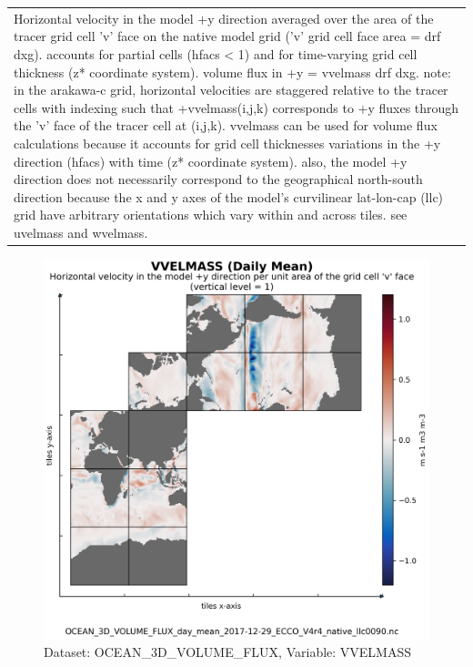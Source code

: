 \begin{longtable}{|m{}|m{}|m{}|m{}|}
\rowcolor{lightgray} \multicolumn{4}{|c|}{\textbf{Comments}} \\ \hline
\multicolumn{4}{|p{1\textwidth}|}{\footnotesize{{Horizontal velocity in the model +y direction averaged over the area of the tracer grid cell 'v' face on the native model grid ('v' grid cell face area = drf dxg). accounts for partial cells (hfacs < 1) and for time-varying grid cell thickness (z* coordinate system). volume flux in +y = vvelmass drf dxg. note: in the arakawa-c grid, horizontal velocities are staggered relative to the tracer cells with indexing such that +vvelmass(i,j,k) corresponds to +y fluxes through the 'v' face of the tracer cell at (i,j,k). vvelmass can be used for volume flux calculations because it accounts for grid cell thicknesses variations in the +y direction (hfacs) with time (z* coordinate system). also, the model +y direction does not necessarily correspond to the geographical north-south direction because the x and y axes of the model's curvilinear lat-lon-cap (llc) grid have arbitrary orientations which vary within and across tiles. see uvelmass and wvelmass.}}} \\ \hline
\end{longtable}

\begin{figure}[H]
\centering
\includegraphics[scale=0.55]{../images/plots/native_plots/Ocean_Three-Dimensional_Volume_Fluxes/VVELMASS.png}
\caption{Dataset: OCEAN\_3D\_VOLUME\_FLUX, Variable: VVELMASS}
\label{tab:table-OCEAN_3D_VOLUME_FLUX_VVELMASS-Plot}
\end{figure}
\newpage
\pagebreak
